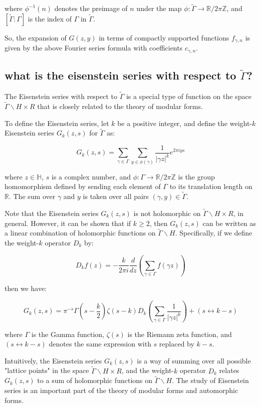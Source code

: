 \documentclass[12pt,a4paper,english]{article}
\theoremstyle{plain}
\theoremstyle{definition}
\theoremstyle{remark}
\begin{document}
where $\phi^{-1}(n)$ denotes the preimage of $n$ under the map $\phi:\tilde{\Gamma} \rightarrow \mathbb{R}/2\pi\mathbb{Z}$, and $[\tilde{\Gamma}:\Gamma]$ is the index of $\Gamma$ in $\tilde{\Gamma}$.

So, the expansion of $G(z,y)$ in terms of compactly supported functions $f_{\gamma,n}$ is given by the above Fourier series formula with coefficients $c_{\gamma,n}$.

\subsection{what is the eisenstein series with respect to $\tilde{\Gamma}$?}
The Eisenstein series with respect to $\tilde{\Gamma}$ is a special type of function on the space $\tilde{\Gamma}\backslash H \times R$ that is closely related to the theory of modular forms.

To define the Eisenstein series, let $k$ be a positive integer, and define the weight-$k$ Eisenstein series $G_k(z,s)$ for $\tilde{\Gamma}$ as:

$$G_k(z,s) = \sum_{\gamma \in \Gamma} \sum_{y \in \phi(\gamma)} \frac{1}{\left|\gamma z\right|^k} e^{2\pi i y s}$$

where $z \in \mathbb{H}$, $s$ is a complex number, and $\phi:\Gamma \rightarrow \mathbb{R}/2\pi\mathbb{Z}$ is the group homomorphism defined by sending each element of $\Gamma$ to its translation length on $\mathbb{R}$. The sum over $\gamma$ and $y$ is taken over all pairs $(\gamma, y) \in \tilde{\Gamma}$.

Note that the Eisenstein series $G_k(z,s)$ is not holomorphic on $\tilde{\Gamma}\backslash H \times R$, in general. However, it can be shown that if $k \geq 2$, then $G_k(z,s)$ can be written as a linear combination of holomorphic functions on $\tilde{\Gamma}\backslash H$. Specifically, if we define the weight-$k$ operator $D_k$ by:

$$D_kf(z) = -\frac{k}{2\pi i}\frac{d}{dz}\left(\sum_{\gamma \in \Gamma} f(\gamma z)\right)$$

then we have:

$$G_k(z,s) = \pi^{-s} \Gamma(s-\frac{k}{2}) \zeta(s-k) D_k\left(\sum_{\gamma \in \Gamma} \frac{1}{\left|\gamma z\right|^k}\right) + (s \leftrightarrow k-s)$$

where $\Gamma$ is the Gamma function, $\zeta(s)$ is the Riemann zeta function, and $(s \leftrightarrow k-s)$ denotes the same expression with $s$ replaced by $k-s$.

Intuitively, the Eisenstein series $G_k(z,s)$ is a way of summing over all possible "lattice points" in the space $\tilde{\Gamma}\backslash H \times R$, and the weight-$k$ operator $D_k$ relates $G_k(z,s)$ to a sum of holomorphic functions on $\tilde{\Gamma}\backslash H$. The study of Eisenstein series is an important part of the theory of modular forms and automorphic forms.
\end{document}
